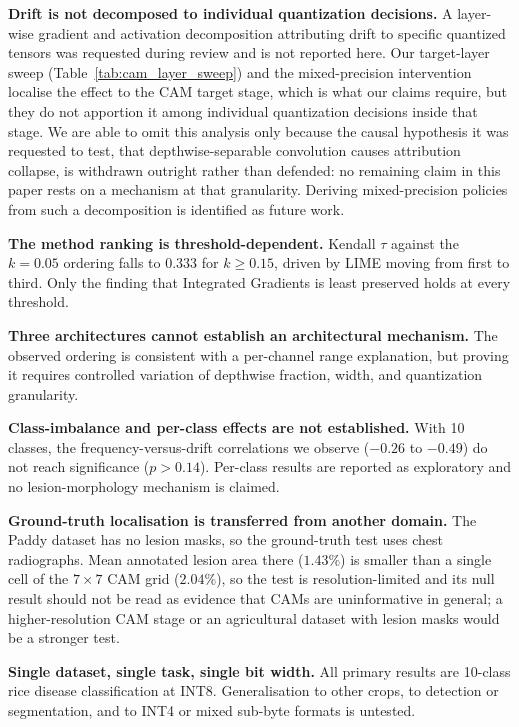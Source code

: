 \documentclass[fleqn,10pt]{wlscirep}
\begin{document}
\textbf{Drift is not decomposed to individual quantization decisions.} A layer-wise gradient and activation decomposition attributing drift to specific quantized tensors was requested during review and is not reported here. Our target-layer sweep (Table~\ref{tab:cam_layer_sweep}) and the mixed-precision intervention localise the effect to the CAM target stage, which is what our claims require, but they do not apportion it among individual quantization decisions inside that stage. We are able to omit this analysis only because the causal hypothesis it was requested to test, that depthwise-separable convolution causes attribution collapse, is withdrawn outright rather than defended: no remaining claim in this paper rests on a mechanism at that granularity. Deriving mixed-precision policies from such a decomposition is identified as future work.

\textbf{The method ranking is threshold-dependent.} Kendall $\tau$ against the $k = 0.05$ ordering falls to $0.333$ for $k \geq 0.15$, driven by LIME moving from first to third. Only the finding that Integrated Gradients is least preserved holds at every threshold.

\textbf{Three architectures cannot establish an architectural mechanism.} The observed ordering is consistent with a per-channel range explanation, but proving it requires controlled variation of depthwise fraction, width, and quantization granularity.

\textbf{Class-imbalance and per-class effects are not established.} With 10 classes, the frequency-versus-drift correlations we observe ($-0.26$ to $-0.49$) do not reach significance ($p > 0.14$). Per-class results are reported as exploratory and no lesion-morphology mechanism is claimed.

\textbf{Ground-truth localisation is transferred from another domain.} The Paddy dataset has no lesion masks, so the ground-truth test uses chest radiographs. Mean annotated lesion area there ($1.43\%$) is smaller than a single cell of the $7 \times 7$ CAM grid ($2.04\%$), so the test is resolution-limited and its null result should not be read as evidence that CAMs are uninformative in general; a higher-resolution CAM stage or an agricultural dataset with lesion masks would be a stronger test.

\textbf{Single dataset, single task, single bit width.} All primary results are 10-class rice disease classification at INT8. Generalisation to other crops, to detection or segmentation, and to INT4 or mixed sub-byte formats is untested.
\end{document}

